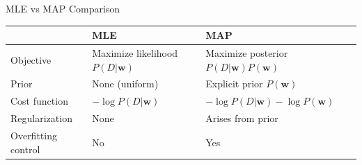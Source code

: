 \documentclass[serif, aspectratio=169]{beamer}
\begin{document}
    \begin{frame}{MLE vs MAP Comparison}
        \centering
        \small
        \renewcommand{\arraystretch}{1.5} %
        \begin{tabular}{|p{3cm}|p{5cm}|p{5cm}|}
            \hline
            & \textbf{MLE} & \textbf{MAP} \\ \hline
            Objective & Maximize likelihood $P(D|\mathbf{w})$ & Maximize posterior $P(D|\mathbf{w})P(\mathbf{w})$ \\ \hline
            Prior & None (uniform) & Explicit prior $P(\mathbf{w})$ \\ \hline
            Cost function & $-\log P(D|\mathbf{w})$ & $-\log P(D|\mathbf{w}) - \log P(\mathbf{w})$ \\ \hline
            Regularization & None & Arises from prior \\ \hline
            Overfitting control & No & Yes \\ \hline
        \end{tabular}
    \end{frame}



\end{document}
